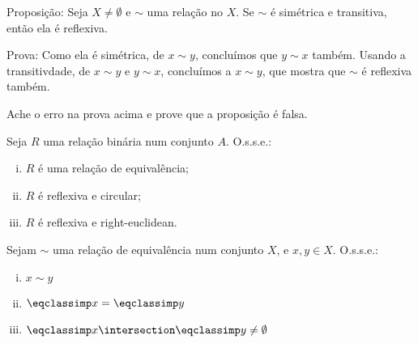 \begin{exercise}
	Proposição: Seja $X \neq \emptyset$ e $\sim$ uma relação no $X$. Se $\sim$ é simétrica e transitiva, então ela é reflexiva.

	Prova: Como ela é simétrica, de $x \sim y$, concluímos que $y \sim x$ também. Usando a transitivdade, de $x \sim y$ e $y \sim x$, concluímos a $x \sim y$, que mostra que $\sim$ é reflexiva também.

	Ache o erro na prova acima e prove que a proposição é falsa.
\end{exercise}

\begin{exercise}
	Seja $R$ uma relação binária num conjunto $A$. O.s.s.e.:
	\begin{enumerate}[(i)]
		\item $R$ é uma relação de equivalência;
		\item $R$ é reflexiva e circular;
		\item $R$ é reflexiva e right-euclidean.
	\end{enumerate}
\end{exercise}

\begin{exercise}
	Sejam $\sim$ uma relação de equivalência num conjunto $X$, e $x, y \in X$. O.s.s.e.:
	\begin{enumerate}[(i)]
		\item $x \sim y$
		\item $\eqclassimp x = \eqclassimp y$
		\item $\eqclassimp x \intersection \eqclassimp y \neq \emptyset$
	\end{enumerate}
\end{exercise}

